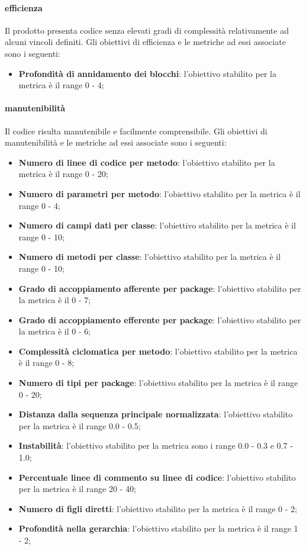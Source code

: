 		 	\paragraph{efficienza}
		 	Il prodotto presenta codice senza elevati gradi di complessità relativamente ad alcuni vincoli definiti.
		 	Gli obiettivi di efficienza e le metriche ad essi associate sono i seguenti:
		 	\begin{itemize}
				\item \textbf{Profondità di annidamento dei blocchi}: l'obiettivo stabilito per la metrica è il range 0 - 4;
			\end{itemize}
		 	\paragraph{manutenibilità}
		 	Il codice risulta manutenibile e facilmente comprensibile.
		 	Gli obiettivi di manutenibilità e le metriche ad essi associate sono i seguenti:
		 	\begin{itemize}
				\item \textbf{Numero di linee di codice per metodo}: l'obiettivo stabilito per la metrica è il range 0 - 20; 
				\item \textbf{Numero di parametri per metodo}: l'obiettivo stabilito per la metrica è il range 0 - 4;
				\item \textbf{Numero di campi dati per classe}: l'obiettivo stabilito per la metrica è il range 0 - 10;
				\item \textbf{Numero di metodi per classe}: l'obiettivo stabilito per la metrica è il range 0 - 10;
				\item \textbf{Grado di accoppiamento afferente per package}: l'obiettivo stabilito per la metrica è il 0 - 7;
				\item \textbf{Grado di accoppiamento efferente per package}: l'obiettivo stabilito per la metrica è il 0 - 6;
				\item \textbf{Complessità ciclomatica per metodo}: l'obiettivo stabilito per la metrica è il range 0 - 8;
				\item \textbf{Numero di tipi per package}: l'obiettivo stabilito per la metrica è il range 0 - 20;
				\item \textbf{Distanza dalla sequenza principale normalizzata}: l'obiettivo stabilito per la metrica è il range 0.0 - 0.5; 
				\item \textbf{Instabilità}: l'obiettivo stabilito per la metrica sono i range 0.0 - 0.3 e 0.7 - 1.0; 
				\item \textbf{Percentuale linee di commento su linee di codice}: l'obiettivo stabilito per la metrica è il range 20 - 40;	
				\item \textbf{Numero di figli diretti}: l'obiettivo stabilito per la metrica è il range 0 - 2;
				\item \textbf{Profondità nella gerarchia}: l'obiettivo stabilito per la metrica è il range 1 - 2;
			\end{itemize}
